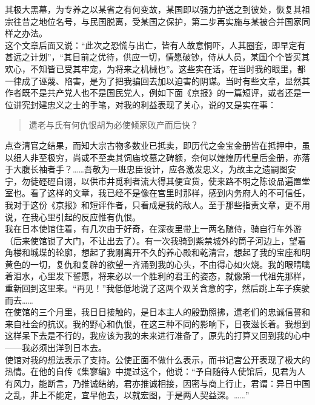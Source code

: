 其极大黑幕，为专养之以某省之有何变故，某国即以强力护送之到彼处，恢复其祖宗往昔之地位名号，与民国脱离，受某国之保护，第二步再实施与某被合并国家同样之办法。\\

这个文章后面又说：“此次之恐慌与出亡，皆有人故意恫吓，人其圈套，即早定有甚远之计划”，“其目前之优待，供应一切，情愿破钞，侍从人员，某国个个皆买其欢心，不知皆已受其牢宠，为将来之机械也”。这些实在话，在当时我的眼里，都一律成了诬蔑、陷害，是为了把我骗回去加以迫害的阴谋。当时有些文章，显然其作者既不是共产党人也不是国民党人，例如下面《京报》的一篇短评，或者还是一位讲究封建忠义之士的手笔，对我的利益表现了关心，说的又是实在事：\\

\begin{quote}
	遗老与氏有何仇恨胡为必使倾家败产而后快？\\
\end{quote}

点查清官之结果，而知大宗古物多数业已抵卖，即历代之金宝金册皆在抵押中，虽以细人非至极穷，尚或不至卖其饲庙坟墓之碑额，奈何以煌煌历代皇后金册，亦落于大腹长袖者手？……吾敬为一班忠臣设计，应各激发忠义，为故主之遗嗣图安宁，勿徒硜硜自诩，以供市井觅利者流大得其便宜货，使来路不明之陈设品遍置堂室也。看了这样的文章，我已经不是像在宫里时那样，感到内务府人的不可信任，我对于这份《京报》和短评作者，只看成是我的敌人。至于那些指责文章，更不用说，在我心里引起的反应惟有仇恨。\\

我在日本使馆住着，有几次由于好奇，在深夜里带上一两名随侍，骑自行车外游（后来使馆锁了大门，不让出去了）。有一次我骑到紫禁城外的筒子河边上，望着角楼和城堞的轮廓，想起了我刚离开不久的养心殿和乾清宫，想起了我的宝座和明黄色的一切，复仇和复辟的欲望一齐涌到我的心头，不由得心如火烧。我的眼睛噙着泪水，心里发下誓愿，将来必以一个胜利的君王的姿态，就像第一代祖先那样，重新回到这里来。“再见！”我低低地说了这两个双关含意的字，然后跳上车子疾驶而去……\\

在使馆的三个月里，我日日接触的，是日本主人的殷勤照拂，遗老们的忠诚信誓和来自社会的抗议。我的野心和仇恨，在这三种不同的影响下，日夜滋长着。我想到这样呆下去是不行的，我应该为我的未来进行准备了，原先的打算又回到我的心中——我必须出洋到日本去。\\

使馆对我的想法表示了支持。公使正面不做什么表示，而书记宫公开表现了极大的热情。在他的自传《集寥编》中提过这个，他说：“予自随待人使馆后，见君为人有风力，能断言，乃推诚结纳，君亦推诚相接，因密与商上行止，君谓：异日中国之乱，非上不能定，宜早他去，以就宏图，于是两人契益深。……”\\

